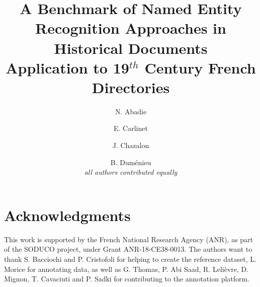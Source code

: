 \documentclass[runningheads,svgnames]{llncs}
\begin{document}
%
\title{A Benchmark of Named Entity Recognition Approaches in Historical Documents\\
Application to 19$^{th}$ Century French Directories%
}
%
%
\author{%
N. Abadie \and
E. Carlinet \and
J. Chazalon \and
B. Duménieu\\
{\footnotesize \emph{all authors contributed equally}}%
}
%
%
%
\maketitle              %
%
\begin{abstract}

\end{abstract}









\section*{Acknowledgments}
This work is supported by the French National Research Agency (ANR), as part of the SODUCO project, under Grant ANR-18-CE38-0013.
%
The authors want to thank S. Bacciochi and P. Cristofoli for helping to create the reference dataset, 
L. Morice for annotating data,
as well as G. Thomas, P. Abi Saad, R. Lelièvre, D. Mignon, T. Cavaciuti and P. Sadki for contributing to the annotation platform.
%



\end{document}
